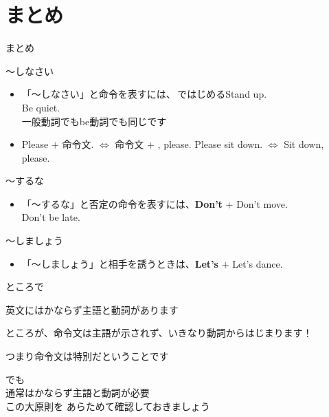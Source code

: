 \documentclass[aspectratio=169,xcolor={dvipsnames,table}]{beamer}
\begin{document}
\section{まとめ}
\begin{frame}[plain]{まとめ}

 \begin{block}{～しなさい}

\begin{itemize}[square]\small
 \item 「～しなさい」と命令を表すには、\,ではじめる\hfill{\scriptsize Stand up.}\\
\hfill{\scriptsize Be quiet.}\\
\hfill{\scriptsize 一般動詞でもbe動詞でも同じです}
 \item Please $+$ 命令文. $\Longleftrightarrow$ 命令文 $+$ , please.%
\hfill{\scriptsize Please sit down. $\Longleftrightarrow$ Sit down, please.}
\end{itemize}
  \end{block}


\begin{block}{～するな}
\begin{itemize}[square]\small
 \item 「～するな」と否定の命令を表すには、\textbf{Don't} $+$ \hfill{\scriptsize Don't move.}\\
\hfill{\scriptsize Don't be late.}
 \end{itemize}
    \end{block}

\begin{block}{～しましょう}
\begin{itemize}[square]\small
 \item 「～しましょう」と相手を誘うときは、\textbf{Let's} $+$ \hfill{\scriptsize Let's dance.}
 \end{itemize}
     \end{block}

\end{frame}
\begin{frame}[plain]{ところで}

\textdbend

 英文にはかならず主語と動詞があります\pause

ところが、命令文は主語が示されず、いきなり動詞からはじまります！\pause

つまり命令文は特別だということです\pause

\bigskip

でも\\
通常はかならず主語と動詞が必要\\
この大原則を
あらためて確認しておきましょう
\end{frame}
\end{document}
